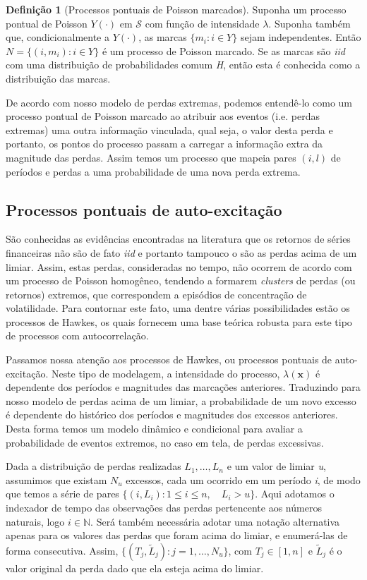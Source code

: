 \documentclass[review]{elsarticle}
\theoremstyle{definition}
\newtheorem{defi}[teor]{Definição}
\begin{document}
\begin{defi}[Processos pontuais de Poisson marcados]
	\label{defi:pppmarcados}
	Suponha um processo pontual de Poisson $Y(\cdot)$ em $\mathcal{S}$ com função de intensidade $\lambda$. Suponha também que, condicionalmente a $Y(\cdot)$, as marcas $\{m_i : i \in Y\}$ sejam independentes. Então $N=\{(i, m_i): i \in Y\}$ é um processo de Poisson marcado. Se as marcas são \emph{iid} com uma distribuição de probabilidades comum \emph{H}, então esta é conhecida como a distribuição das marcas.
\end{defi}

De acordo com nosso modelo de perdas extremas, podemos entendê-lo como um processo pontual de Poisson marcado ao atribuir aos eventos (i.e. perdas extremas) uma outra informação vinculada, qual seja, o valor desta perda e portanto, os pontos do processo passam a carregar a informação extra da magnitude das perdas. Assim temos um processo que mapeia pares $(i, l)$ de períodos e perdas a uma probabilidade de uma nova perda extrema.

\subsection{Processos pontuais de auto-excitação}
\label{sec:autoex}

São conhecidas as evidências encontradas na literatura que os retornos de séries financeiras não são de fato \emph{iid} e portanto tampouco o são as perdas acima de um limiar. Assim, estas perdas, consideradas no tempo, não ocorrem de acordo com um processo de Poisson homogêneo, tendendo a formarem \emph{clusters} de perdas (ou retornos) extremos, que correspondem a episódios de concentração de volatilidade. Para contornar este fato, uma dentre várias possibilidades estão os processos de Hawkes, os quais fornecem uma base teórica robusta para este tipo de processos com autocorrelação.

Passamos nossa atenção aos processos de Hawkes, ou processos pontuais de auto-excitação. Neste tipo de modelagem, a intensidade do processo, $\lambda(\mathbf{x})$ é dependente dos períodos e magnitudes das marcações anteriores. Traduzindo para nosso modelo de perdas acima de um limiar, a probabilidade de um novo excesso é dependente do histórico dos períodos e magnitudes dos excessos anteriores. Desta forma temos um modelo dinâmico e condicional para avaliar a probabilidade de eventos extremos, no caso em tela, de perdas excessivas.

Dada a distribuição de perdas realizadas $L_1, \ldots , L_n$ e um valor de limiar \emph{u}, assumimos que existam $N_u$ excessos, cada um ocorrido em um período \emph{i}, de modo que temos a série de pares $\{(i, L_i): 1\leq i \leq n, \quad L_i > u\}$. Aqui adotamos o indexador de tempo das observações das perdas pertencente aos números naturais, logo $i\in \mathbb{N}$. Será também necessária adotar uma notação alternativa apenas para os valores das perdas que foram acima do limiar, e enumerá-las de forma consecutiva. Assim, $\{(T_j, \tilde{L}_j): j=1, \ldots , N_u\}$, com $T_j \in [1,n]$ e $\tilde{L}_j$ é o valor original da perda dado que ela esteja acima do limiar.
\end{document}
